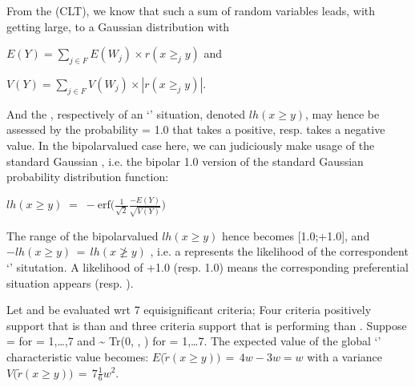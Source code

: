 \documentclass[a4paper,10pt,english]{sphinxhowto}
\begin{document}
From the  (CLT), we know that such a sum of random variables leads, with  getting large, to a Gaussian distribution  with

\(E(Y ) = \sum_{j \in F} E(W_j) \times r(x \geq_j y)\) and

\(V(Y) = \sum_{j \in F} V(W_j)\times |r(x \geq_j y)|\).

And the , respectively  of an ‘’ situation, denoted \(lh(x \geq y)\),  may hence be assessed by the probability  = 1.0 \sphinxhyphen{}  that  takes a positive, resp.  takes a negative value. In the bipolar\sphinxhyphen{}valued case here, we can judiciously make usage of the standard Gaussian  , i.e. the bipolar  \sphinxhyphen{} 1.0 version of the standard Gaussian  probability distribution function:

\(lh(x \geq y) \;=\; -\text{erf}\big(\frac{1}{\sqrt{2}}\frac{-E(Y)}{\sqrt{V(Y)}} \big)\)

The range of the bipolar\sphinxhyphen{}valued \(lh(x \geq y)\) hence becomes {[}\sphinxhyphen{}1.0;+1.0{]}, and \(-lh(x \geq y) \,=\, lh(x \not\geq y)\) , i.e. a  represents the likelihood of the correspondent  ‘’ situtation. A likelihood of +1.0 (resp. \sphinxhyphen{}1.0) means the corresponding preferential situation appears  (resp. ).


Let  and  be evaluated wrt 7 equisignificant criteria; Four criteria positively support that  is  than  and three criteria support that  is  performing than . Suppose  =  for  = 1,…,7 and  \textasciitilde{} Tr(0, , ) for  = 1,…7. The expected value of the global ‘’ characteristic value becomes: \(E\big(\tilde{r}(x \geq y)\big)\, = \, 4w - 3w = w\) with a variance \(V\big(\tilde{r}(x \geq y)\big)\,=\, 7\frac{1}{6}w^2\).
\end{document}
